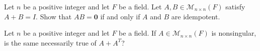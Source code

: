 \probskip

\begin{ex}[Golan 467]
Let $n$ be a positive integer and let $F$ be a field.  Let 
$A, B\in \mathcal{M}_{n\times n}(F)$ satisfy $A + B = I$.  Show that $AB = \mathbf{0}$
if and only if $A$ and $B$ are idempotent.
\end{ex}

\probskip

\begin{ex}[Golan 530]
Let $n$ be a positive integer and let $F$ be a field.  If
$A \in \mathcal{M}_{n\times n}(F)$ is nonsingular, is the same necessarily true
of $A + A^T$?
\end{ex}

%
%


